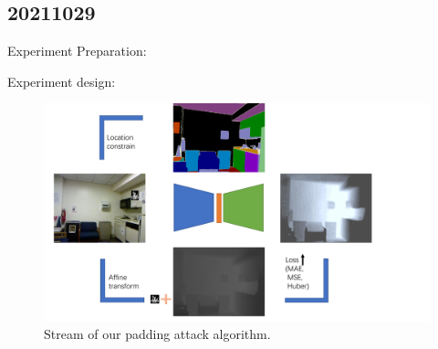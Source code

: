 \documentclass[10pt]{beamer}
\begin{document}
\subsection{20211029}
\begin{frame}
  Experiment Preparation:
  \begin{figure}
      \end{figure}
\end{frame}
\begin{frame}
 Experiment design:
 \begin{figure}
   \includegraphics[width=1\linewidth]{figure/20211029/stream.pdf}
    \caption{Stream of our padding attack algorithm.}
 \end{figure}
\end{frame}
\end{document}
